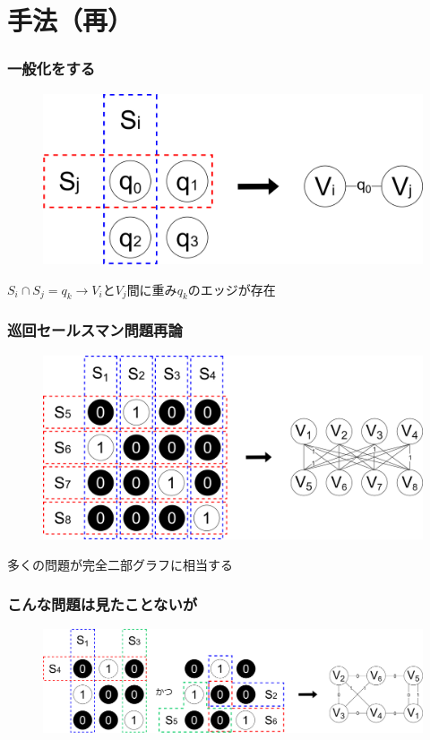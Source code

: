 \section{手法（再）}
\begin{frame}
  \frametitle{一般化をする}
  \begin{figure}
    \includegraphics[width=0.8\linewidth]{data/bit_to_graph.png}
  \end{figure}
  \centering
  $S_i\cap S_j = q_k \rightarrow V_i \text{と} V_j \text{間に重み}q_k\text{のエッジが存在}$
\end{frame}

\begin{frame}
  \frametitle{巡回セールスマン問題再論}
  \begin{figure}
      \includegraphics[width=0.85\linewidth]{data/kanzen2ji_to_graph}
  \end{figure}
  \centering
  多くの問題が完全二部グラフに相当する
\end{frame}

\begin{frame}
  \frametitle{こんな問題は見たことないが}
  \begin{figure}
      \includegraphics[width=1\linewidth]{data/2ji_to_graph}
  \end{figure}
\end{frame}

